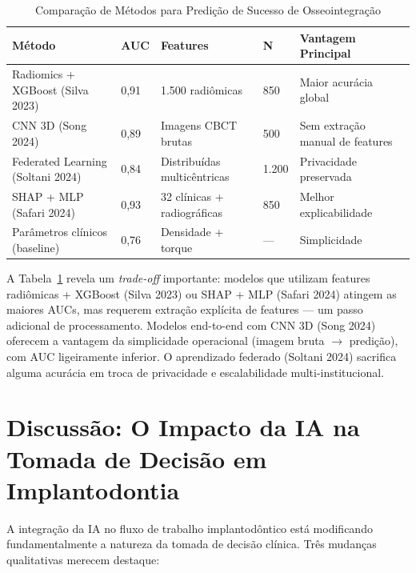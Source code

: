 \begin{table}[H]
\centering
\caption{Comparação de Métodos para Predição de Sucesso de Osseointegração}
\label{tab:osseointegration-methods}
\begin{tabular}{p{2.8cm}p{2cm}p{2cm}p{2.2cm}p{2.5cm}}
\toprule
\textbf{Método} & \textbf{AUC} & \textbf{Features} & \textbf{N} & \textbf{Vantagem Principal} \\
\midrule
Radiomics + XGBoost (Silva 2023) & 0,91 & 1.500 radiômicas & 850 & Maior acurácia global \\
CNN 3D (Song 2024) & 0,89 & Imagens CBCT brutas & 500 & Sem extração manual de features \\
Federated Learning (Soltani 2024) & 0,84 & Distribuídas multicêntricas & 1.200 & Privacidade preservada \\
SHAP + MLP (Safari 2024) & 0,93 & 32 clínicas + radiográficas & 850 & Melhor explicabilidade \\
Parâmetros clínicos (baseline) & 0,76 & Densidade + torque & --- & Simplicidade \\
\bottomrule
\end{tabular}
\end{table}

A Tabela~\ref{tab:osseointegration-methods} revela um \textit{trade-off} importante: modelos que utilizam features radiômicas + XGBoost (Silva 2023) ou SHAP + MLP (Safari 2024) atingem as maiores AUCs, mas requerem extração explícita de features --- um passo adicional de processamento. Modelos end-to-end com CNN 3D (Song 2024) oferecem a vantagem da simplicidade operacional (imagem bruta $\rightarrow$ predição), com AUC ligeiramente inferior. O aprendizado federado (Soltani 2024) sacrifica alguma acurácia em troca de privacidade e escalabilidade multi-institucional.

\section{Discussão: O Impacto da IA na Tomada de Decisão em Implantodontia}

A integração da IA no fluxo de trabalho implantodôntico está modificando fundamentalmente a natureza da tomada de decisão clínica. Três mudanças qualitativas merecem destaque:


